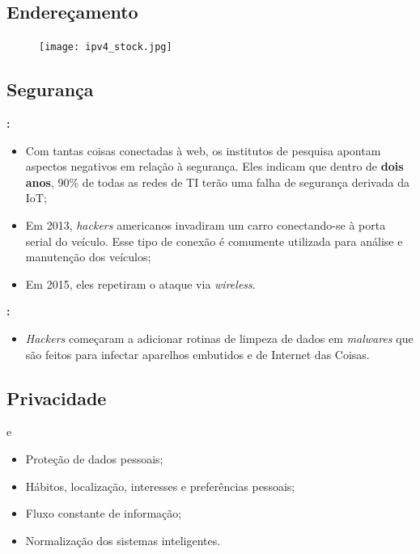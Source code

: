 \subsection*{Endereçamento}
\begin{frame}{}
	\begin{figure}[H]
		\texttt{[image: ipv4\_stock.jpg]}\footnotemark
	\end{figure}
	
\end{frame}

\subsection*{Segurança}
\begin{frame}{}
	\begin{block}{}
		\textbf{\cite{ComputerWorld}:}
		\begin{itemize}
			\item Com tantas coisas conectadas à web, os institutos de pesquisa apontam aspectos negativos em relação à segurança. Eles indicam que dentro de \textbf{dois anos}, 90\% de todas as redes de TI terão uma falha de segurança derivada da IoT;
			\item Em 2013, \textit{hackers} americanos invadiram um carro conectando-se à porta serial do veículo. Esse tipo de conexão é comumente utilizada para análise e manutenção dos veículos;
			\item Em 2015, eles repetiram o ataque via \textit{wireless}. 
		\end{itemize}
		\textbf{\cite{IDGNOW}:}
		\begin{itemize}
			\item \textit{Hackers} começaram a adicionar rotinas de limpeza de dados em \textit{malwares} que são feitos para infectar aparelhos embutidos e de Internet das Coisas.
		\end{itemize}
	\end{block}
\end{frame}

\subsection*{Privacidade}
\begin{frame}{}
	\begin{block}{\cite{PedroValente} e \cite{P2413}}
		\begin{itemize}
			\item Proteção de dados pessoais;
			\item Hábitos, localização, interesses e preferências pessoais;
			\item Fluxo constante de informação;
			\item Normalização dos sistemas inteligentes.
		\end{itemize}
	\end{block}
\end{frame}

